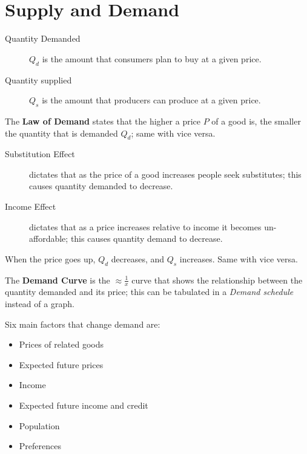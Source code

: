             \section{Supply and Demand} %
            \label{sec:demand_curve}
                \begin{description}
                    \item[Quantity Demanded] $Q_d$ is the amount that consumers plan to buy at a given price.
                    \item[Quantity supplied] $Q_s$ is the amount that producers can produce at a given price.
                \end{description}

                The \textbf{Law of Demand} states that the higher a price $P$ of a good is, the smaller the quantity that is demanded  $Q_d$; same with vice versa.

                \begin{description}
                    \item[Substitution Effect] dictates that as the price of a good increases people seek substitutes; this causes quantity demanded to decrease.
                    \item[Income Effect] dictates that as a price increases relative to income it becomes un-affordable; this causes quantity demand to decrease.
                \end{description}
                When the price goes up, $Q_d$ decreases, and $Q_s$ increases. Same with vice versa.

                The \textbf{Demand Curve} is the $\approx \frac{1}{x}$ curve that shows the relationship between the quantity demanded and its price; this can be tabulated in a \emph{Demand schedule} instead of a graph.

                Six main factors that change demand are:
                \begin{itemize}
                    \item Prices of related goods
                    \item Expected future prices
                    \item Income
                    \item Expected future income and credit
                    \item Population
                    \item Preferences
                \end{itemize}

